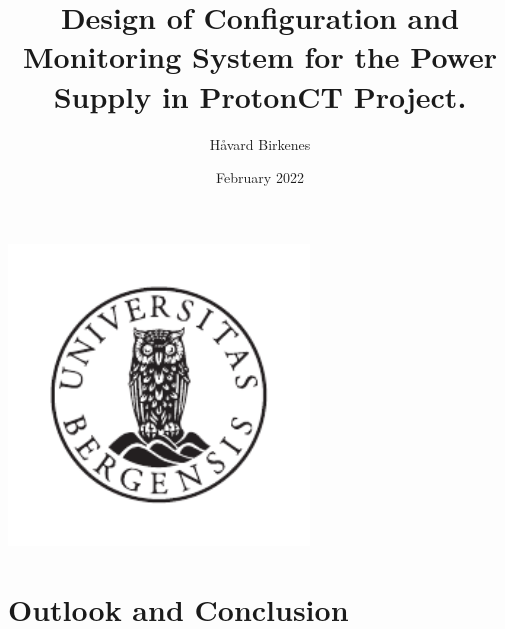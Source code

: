 \documentclass[12pt]{article}
\title{Design of Configuration and Monitoring System for the Power Supply in ProtonCT Project.}
\author{Håvard Birkenes}
\date{February 2022}
\begin{document}
\renewcommand{\notinmain}[1]{}
    \maketitle
    \begin{center}
        \includegraphics[width=8cm]{images/UiB-emblem_gray.pdf}
    \end{center}


    \newpage
    \tableofcontents
    \newpage
    \printglossary
    \printglossary[type=\acronymtype]
    \newpage
    
    \newpage






    
\newpage
    
\newpage
    
\newpage
    
\newpage
    
\newpage

    
\newpage

\newpage
\section{Outlook and Conclusion}


\newpage


\newpage


\end{document}
